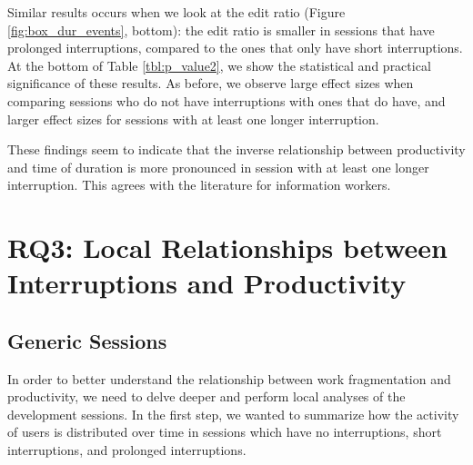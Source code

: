 \documentclass[times]{smrauth}
\begin{document}



Similar results occurs when we look at the edit ratio (Figure \ref{fig:box_dur_events}, bottom): the edit ratio is smaller in sessions that have prolonged interruptions, compared to the ones that only have short interruptions. At the bottom of Table \ref{tbl:p_value2}, we show the statistical and practical significance of these results. As before, we observe large effect sizes when comparing sessions who do not have interruptions with ones that do have, and larger effect sizes for sessions with at least one longer interruption.

These findings seem to indicate that the inverse relationship between productivity and time of duration is more pronounced in session with at least one longer interruption. This agrees with the literature for information workers.

\section{RQ3: Local Relationships between Interruptions and Productivity}

\subsection{Generic Sessions}
In order to better understand the relationship between work fragmentation and productivity, we need to delve deeper and perform local analyses of the development sessions. In the first step, we wanted to summarize how the activity of users is distributed over time in sessions which have no interruptions, short interruptions, and prolonged interruptions. 
\end{document}
